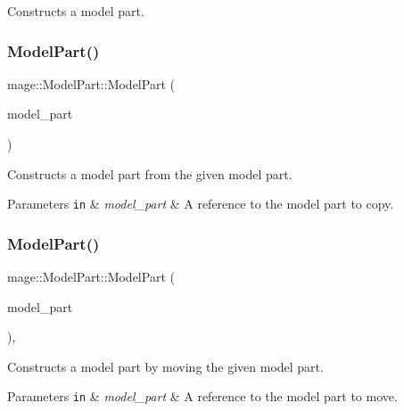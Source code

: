 Constructs a model part. \hypertarget{structmage_1_1_model_part_a3c39c2c312f07687f8ad5c2c2580d1e2}{}\label{structmage_1_1_model_part_a3c39c2c312f07687f8ad5c2c2580d1e2} 
\subsubsection{\texorpdfstring{Model\+Part()}{ModelPart()}\hspace{0.1cm}{\footnotesize\ttfamily [2/3]}}
{\footnotesize\ttfamily mage\+::\+Model\+Part\+::\+Model\+Part (\begin{DoxyParamCaption}\item[{const \hyperlink{structmage_1_1_model_part}{Model\+Part} \&}]{model\+\_\+part }\end{DoxyParamCaption})\hspace{0.3cm}{\ttfamily [default]}}

Constructs a model part from the given model part.


\begin{DoxyParams}[1]{Parameters}
\mbox{\tt in}  & {\em model\+\_\+part} & A reference to the model part to copy. \\
\hline
\end{DoxyParams}
\hypertarget{structmage_1_1_model_part_a7cde529f13e74aac853de739d9f44829}{}\label{structmage_1_1_model_part_a7cde529f13e74aac853de739d9f44829} 
\subsubsection{\texorpdfstring{Model\+Part()}{ModelPart()}\hspace{0.1cm}{\footnotesize\ttfamily [3/3]}}
{\footnotesize\ttfamily mage\+::\+Model\+Part\+::\+Model\+Part (\begin{DoxyParamCaption}\item[{\hyperlink{structmage_1_1_model_part}{Model\+Part} \&\&}]{model\+\_\+part }\end{DoxyParamCaption})\hspace{0.3cm}{\ttfamily [default]}, {\ttfamily [noexcept]}}

Constructs a model part by moving the given model part.


\begin{DoxyParams}[1]{Parameters}
\mbox{\tt in}  & {\em model\+\_\+part} & A reference to the model part to move. \\
\hline
\end{DoxyParams}
\hypertarget{structmage_1_1_model_part_a3322c5c7924ec30be170ae1ed6dca550}{}\label{structmage_1_1_model_part_a3322c5c7924ec30be170ae1ed6dca550} 
